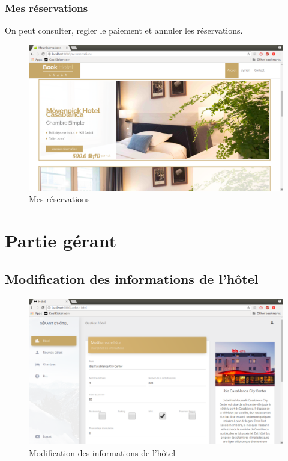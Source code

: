 \documentclass[12pt,a4paper]{report}
\begin{document}
	\subsubsection{Mes réservations}
On peut consulter, regler le paiement et annuler les réservations.\\
	\vspace{2cm}
	\begin{figure}[!hbtp]
		\centering
		\includegraphics[scale=0.3]{./graphics/mesreservations.png}
		\caption{Mes réservations}
		\end{figure}
		\newpage		
	
	 
	\section{Partie gérant}
	\subsection{Modification des informations de l'hôtel}
	\begin{figure}[!hbtp]
		\centering
		\includegraphics[scale=0.3]{./graphics/updatehotel.png}
		\caption{Modification des informations de l'hôtel}
		\end{figure}
		\newpage	
\end{document}
